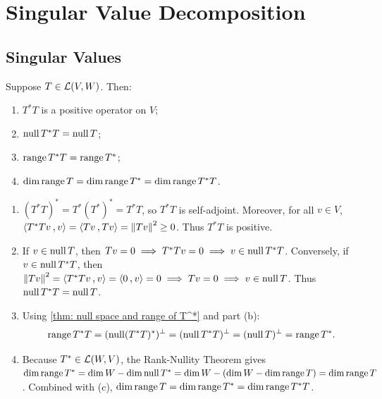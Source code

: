 \section{Singular Value Decomposition}

\subsection{Singular Values}

\begin{thm}[properties of $T^*T$]
  \label{thm: properties of T^*T}
  Suppose $T \in \mathcal{L}(V,W)$. Then:
  \begin{enumerate}[label=\textbf{(\alph*)}]
    \item $T^*T$ is a positive operator on $V$;
    \item $\operatorname{null} T^*T = \operatorname{null} T$;
    \item $\operatorname{range} T^*T = \operatorname{range} T^*$;
    \item $\dim \operatorname{range} T = \dim \operatorname{range} T^* = \dim  \operatorname{range} T^*T$.
  \end{enumerate}
\end{thm}
\begin{prf}
  \begin{enumerate}[label=\textbf{(\alph*)}]
    \item $(T^*T)^* = T^*(T^*)^* = T^*T$, so $T^*T$ is self-adjoint. Moreover, for all $v \in V$, $\ip{T^*Tv}{v} = \ip{Tv}{Tv} = \norm{Tv}^2 \geq 0$. Thus $T^*T$ is positive.
    \item If $v \in \operatorname{null} T$, then $Tv = 0 \implies T^*Tv = 0 \implies v \in \operatorname{null} T^*T$.
    Conversely, if $v \in \operatorname{null} T^*T$, then $\norm{Tv}^2 = \ip{T^*Tv}{v} = \ip{0}{v} = 0 \implies Tv = 0 \implies v \in \mynull T$.
    Thus $\operatorname{null} T^*T = \operatorname{null} T$.
    \item Using \ref{thm: null space and range of T^*} and part (b):
    \begin{equation}
      \operatorname{range} T^*T = (\operatorname{null} (T^*T)^*)^\bot = (\operatorname{null} T^*T)^\bot = (\operatorname{null} T)^\bot = \operatorname{range} T^*.
    \end{equation}
    \item Because $T^* \in \mathcal{L}(W,V)$, the Rank-Nullity Theorem gives $\dim \operatorname{range} T^* = \dim W - \dim \operatorname{null} T^* = \dim W - (\dim W - \dim \operatorname{range} T) = \dim \operatorname{range} T$.
    Combined with (c), $\dim \operatorname{range} T = \dim \operatorname{range} T^* = \dim \operatorname{range} T^*T$.
  \end{enumerate}
  \vspace{-\baselineskip}
\end{prf}


